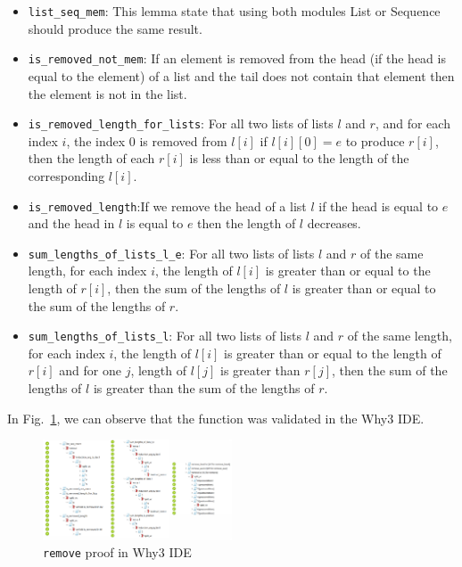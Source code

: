\documentclass[runningheads]{llncs}
\begin{document}
\begin{itemize}
  \item \texttt{list\_seq\_mem}: This lemma state that using both modules List or Sequence should produce the same result.
  \item \texttt{is\_removed\_not\_mem}: If an element is removed from the head (if the head is equal to the element) of a list and the tail does not contain that element then the element is not in the list.
  \item \texttt{is\_removed\_length\_for\_lists}: For all two lists of lists $l$ and $r$, and for each index $i$, the index $0$ is removed from $l[i]$ if $l[i][0] = e$ to produce $r[i]$, then the length of each $r[i]$ is less than or equal to the length of the corresponding $l[i]$.
  \item \texttt{is\_removed\_length}:If we remove the head of a list $l$ if the head is equal to $e$ and the head in $l$ is equal to $e$ then the length of $l$ decreases.
  \item \texttt{sum\_lengths\_of\_lists\_l\_e}: For all two lists of lists $l$ and $r$ of the same length, for each index $i$, the length of $l[i]$ is greater than or equal to the length of $r[i]$, then the sum of the lengths of $l$ is greater than or equal to the sum of the lengths of $r$.
  \item \texttt{sum\_lengths\_of\_lists\_l}: For all two lists of lists $l$ and $r$ of the same length, for each index $i$, the length of $l[i]$ is greater than or equal to the length of $r[i]$ and for one $j$, length of $l[j]$ is greater than $r[j]$, then the sum of the lengths of $l$ is greater than the sum of the lengths of $r$.
\end{itemize}
In Fig.~\ref{fig:Why3Remove}, we can observe that the function was validated in the Why3 IDE.
\begin{figure}[htbp]
  \centering
  \includegraphics[width=0.5\textwidth]{images/removeWhy3IDE.png}
  \caption{\texttt{remove} proof in Why3 IDE}
  \label{fig:Why3Remove} 
\end{figure}
\end{document}
